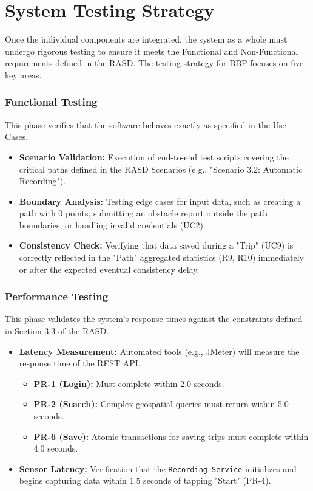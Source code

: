 \section{System Testing Strategy}
Once the individual components are integrated, the system as a whole must undergo rigorous testing to ensure it meets the Functional and Non-Functional requirements defined in the RASD. The testing strategy for BBP focuses on five key areas.

\subsubsection{Functional Testing}
This phase verifies that the software behaves exactly as specified in the Use Cases.
\begin{itemize}
    \item \textbf{Scenario Validation:} Execution of end-to-end test scripts covering the critical paths defined in the RASD Scenarios (e.g., "Scenario 3.2: Automatic Recording").
    \item \textbf{Boundary Analysis:} Testing edge cases for input data, such as creating a path with 0 points, submitting an obstacle report outside the path boundaries, or handling invalid credentials (UC2).
    \item \textbf{Consistency Check:} Verifying that data saved during a "Trip" (UC9) is correctly reflected in the "Path" aggregated statistics (R9, R10) immediately or after the expected eventual consistency delay.
\end{itemize}

\subsubsection{Performance Testing}
This phase validates the system's response times against the constraints defined in Section 3.3 of the RASD.
\begin{itemize}
    \item \textbf{Latency Measurement:} Automated tools (e.g., JMeter) will measure the response time of the REST API.
    \begin{itemize}
        \item \textbf{PR-1 (Login):} Must complete within 2.0 seconds.
        \item \textbf{PR-2 (Search):} Complex geospatial queries must return within 5.0 seconds.
        \item \textbf{PR-6 (Save):} Atomic transactions for saving trips must complete within 4.0 seconds.
    \end{itemize}
    \item \textbf{Sensor Latency:} Verification that the \texttt{Recording Service} initializes and begins capturing data within 1.5 seconds of tapping "Start" (PR-4).
\end{itemize}

